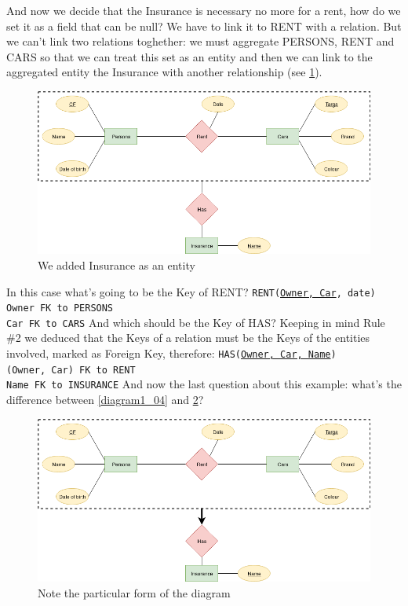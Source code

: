 \documentclass[class=book, crop=false, oneside]{standalone}
\newcommand\tab[1][1cm]{\hspace*{#1}}
\begin{document}
And now we decide that the Insurance is necessary no more for a rent, how do we set it as a field that can be null?
We have to link it to RENT with a relation.
But we can't link two relations toghether: we must aggregate PERSONS, RENT and CARS so that we can treat this set as an entity and then we can link to the aggregated entity the Insurance with another relationship (see \ref{diagram1_05}).
\begin{figure}[H]
	\includegraphics[width=\textwidth,keepaspectratio]{diagram1_05.png}
	\caption{We added Insurance as an entity}
	\label{diagram1_05}
\end{figure}
In this case what's going to be the Key of RENT?
\vskip 10pt
\texttt{RENT(\underline{Owner, Car}, date)}\\
	\tab[.8cm] \texttt{Owner FK to PERSONS}\\
	\tab[.8cm] \texttt{Car FK to CARS}
\vskip 10pt
And which should be the Key of HAS?
Keeping in mind Rule \#2 we deduced that the Keys of a relation must be the Keys of the entities involved, marked as Foreign Key, therefore:
\vskip 10pt
\texttt{HAS(\underline{Owner, Car, Name})}\\
	\tab[.8cm] \texttt{(Owner, Car) FK to RENT}\\
	\tab[.8cm] \texttt{Name FK to INSURANCE}
\vskip 10pt
And now the last question about this example: what's the difference between \ref{diagram1_04} and \ref{diagram1_06}?
\begin{figure}[H]
	\includegraphics[width=\textwidth,keepaspectratio]{diagram1_06.png}
	\caption{Note the particular form of the diagram}
	\label{diagram1_06}
\end{figure}
\end{document}
